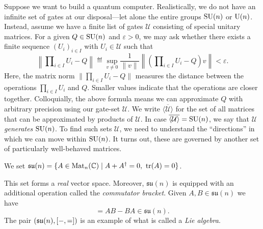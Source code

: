 \documentclass[a4paper, oneside, 12pt]{amsart}
\begin{document}
\noindent
\setlength{\fboxrule}{4pt}
\bigskip

Suppose we want to build a quantum computer.
Realistically, we do not have an infinite set of gates at our disposal---let alone the entire groups \( \operatorname{SU}(n) \) or \(\operatorname{U}(n)\).
Instead, assume we have a finite list of gates \( \mathcal{U} \) consisting of special unitary matrices.
For a given \( Q \in \operatorname{SU}(n) \) and \( \varepsilon > 0 \), we may ask whether there exists a finite sequence \( (U_i)_{i \in I} \) with \( U_i \in \mathcal{U} \) such that
\begin{equation*}
  \left\| \prod\nolimits_{i\in I} U_{i} - Q\right\| \eqdef \sup_{v \neq 0}\frac{1}{\|v\|}{\left\|\left( \prod\nolimits_{i\in I} U_{i} - Q\right)v\right\|} < \varepsilon.
\end{equation*}
Here, the matrix norm \( \| \prod_{i \in I} U_i - Q \| \) measures the distance between the operations \( \prod_{i \in I} U_i \) and \( Q \).
Smaller values indicate that the operations are closer together.
Colloquially, the above formula means we can approximate \(Q\) with arbitrary precision using our gate-set \( \mathcal{U} \).
We write \(\overline{\langle \mathcal{U} \rangle}\) for the set of all matrices that can be approximated by products of \(\mathcal{U}\).
In case \(\overline{\langle \mathcal{U} \rangle} = \operatorname{SU}(n)\), we say that \( \mathcal{U} \) \emph{generates} \( \operatorname{SU}(n) \).
To find such sets \( \mathcal{U} \), we need to understand the ``directions'' in which we can move within \( \operatorname{SU}(n)\).
It turns out, these are governed by another set of particularly well-behaved matrices.
\begin{definition}\label{def:lie-algebra-su(n)}
  We set \( \mathfrak{su}(n)=\{ A \in \operatorname{Mat}_n(\mathbb{C}) \mid A + A^\dagger = 0, \ \mathrm{tr}(A) = 0 \}\).
\end{definition}
This set forms a \emph{real} vector space.
Moreover, \(\mathfrak{su}(n)\)  is equipped with an additional operation called the \emph{commutator bracket}.
Given \(A, B \in \mathfrak{su}(n)\) we have
\begin{equation*}
  [A, B] = AB - BA \in \mathfrak{su}(n).
\end{equation*}
The pair \( (\mathfrak{su}(n), [ {-} , {=}]) \) is an example of what is called  a \emph{Lie algebra}.
\end{document}
